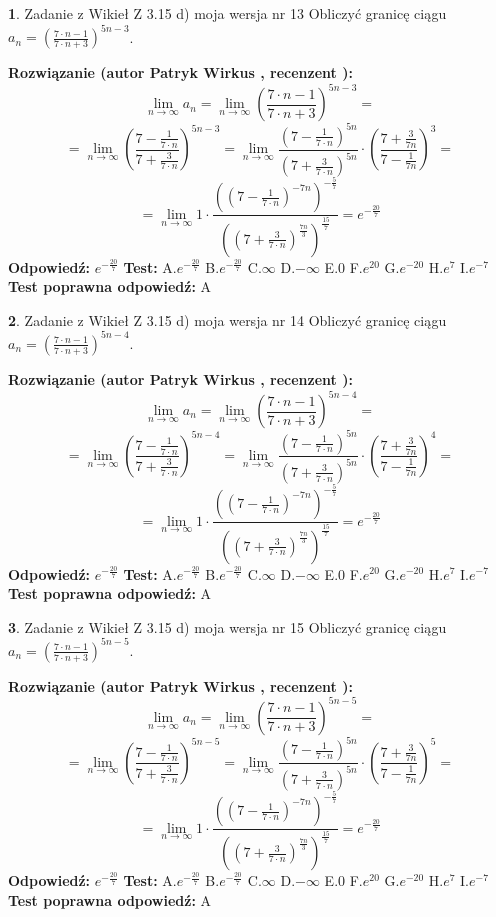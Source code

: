 \documentclass[12pt, a4paper]{article}
\theoremstyle{definition} %
\newtheorem{zad}{}
\newcommand{\zadStart}[1]{\begin{zad}#1\newline}
\newcommand{\zadStop}{\end{zad}}
\newcommand{\rozwStart}[2]{\noindent \textbf{Rozwiązanie (autor #1 , recenzent #2): }\newline}
\newcommand{\rozwStop}{\newline}
\newcommand{\odpStart}{\noindent \textbf{Odpowiedź:}\newline}
\newcommand{\odpStop}{\newline}
\newcommand{\testStart}{\noindent \textbf{Test:}\newline}
\newcommand{\testStop}{\newline}
\newcommand{\kluczStart}{\noindent \textbf{Test poprawna odpowiedź:}\newline}
\newcommand{\kluczStop}{\newline}
\begin{document}
\zadStart{Zadanie z Wikieł Z 3.15 d) moja wersja nr 13}
Obliczyć granicę ciągu $a_{n}=(\frac{7\cdot n - 1}{7 \cdot n + 3})^{5n-3}$.
\zadStop
\rozwStart{Patryk Wirkus}{}
$$\lim\limits_{n\to\infty} a_{n} = \lim\limits_{n\to\infty}(\frac{7\cdot n - 1}{7 \cdot n + 3})^{5n-3}=$$
$$=\lim\limits_{n\to\infty}(\frac{7 - \frac{1}{7\cdot n}}{7 + \frac{3}{7 \cdot n}})^{5n-3}=\lim\limits_{n\to\infty}\frac{(7 - \frac{1}{7\cdot n})^{5n}}{(7 + \frac{3}{7\cdot n})^{5n}} \cdot (\frac{7+\frac{3}{7n}}{7-\frac{1}{7n}})^{3}=$$
$$=\lim\limits_{n\to\infty} 1 \cdot \frac{((7-\frac{1}{7 \cdot n})^{-7n})^{-\frac{5}{7}}}{((7+\frac{3}{7 \cdot n})^{\frac{7n}{3}})^{\frac{15}{7}}} =e^{-\frac{20}{7}}$$
\rozwStop
\odpStart
$e^{-\frac{20}{7}}$
\odpStop
\testStart
A.$ e^{-\frac{20}{7}}$
B.$ e^{-\frac{20}{7}}$
C.$\infty$
D.$-\infty$
E.$0$
F.$e^{20}$
G.$e^{-20}$
H.$e^{7}$
I.$e^{-7}$
\testStop
\kluczStart
A
\kluczStop



\zadStart{Zadanie z Wikieł Z 3.15 d) moja wersja nr 14}
Obliczyć granicę ciągu $a_{n}=(\frac{7\cdot n - 1}{7 \cdot n + 3})^{5n-4}$.
\zadStop
\rozwStart{Patryk Wirkus}{}
$$\lim\limits_{n\to\infty} a_{n} = \lim\limits_{n\to\infty}(\frac{7\cdot n - 1}{7 \cdot n + 3})^{5n-4}=$$
$$=\lim\limits_{n\to\infty}(\frac{7 - \frac{1}{7\cdot n}}{7 + \frac{3}{7 \cdot n}})^{5n-4}=\lim\limits_{n\to\infty}\frac{(7 - \frac{1}{7\cdot n})^{5n}}{(7 + \frac{3}{7\cdot n})^{5n}} \cdot (\frac{7+\frac{3}{7n}}{7-\frac{1}{7n}})^{4}=$$
$$=\lim\limits_{n\to\infty} 1 \cdot \frac{((7-\frac{1}{7 \cdot n})^{-7n})^{-\frac{5}{7}}}{((7+\frac{3}{7 \cdot n})^{\frac{7n}{3}})^{\frac{15}{7}}} =e^{-\frac{20}{7}}$$
\rozwStop
\odpStart
$e^{-\frac{20}{7}}$
\odpStop
\testStart
A.$ e^{-\frac{20}{7}}$
B.$ e^{-\frac{20}{7}}$
C.$\infty$
D.$-\infty$
E.$0$
F.$e^{20}$
G.$e^{-20}$
H.$e^{7}$
I.$e^{-7}$
\testStop
\kluczStart
A
\kluczStop



\zadStart{Zadanie z Wikieł Z 3.15 d) moja wersja nr 15}
Obliczyć granicę ciągu $a_{n}=(\frac{7\cdot n - 1}{7 \cdot n + 3})^{5n-5}$.
\zadStop
\rozwStart{Patryk Wirkus}{}
$$\lim\limits_{n\to\infty} a_{n} = \lim\limits_{n\to\infty}(\frac{7\cdot n - 1}{7 \cdot n + 3})^{5n-5}=$$
$$=\lim\limits_{n\to\infty}(\frac{7 - \frac{1}{7\cdot n}}{7 + \frac{3}{7 \cdot n}})^{5n-5}=\lim\limits_{n\to\infty}\frac{(7 - \frac{1}{7\cdot n})^{5n}}{(7 + \frac{3}{7\cdot n})^{5n}} \cdot (\frac{7+\frac{3}{7n}}{7-\frac{1}{7n}})^{5}=$$
$$=\lim\limits_{n\to\infty} 1 \cdot \frac{((7-\frac{1}{7 \cdot n})^{-7n})^{-\frac{5}{7}}}{((7+\frac{3}{7 \cdot n})^{\frac{7n}{3}})^{\frac{15}{7}}} =e^{-\frac{20}{7}}$$
\rozwStop
\odpStart
$e^{-\frac{20}{7}}$
\odpStop
\testStart
A.$ e^{-\frac{20}{7}}$
B.$ e^{-\frac{20}{7}}$
C.$\infty$
D.$-\infty$
E.$0$
F.$e^{20}$
G.$e^{-20}$
H.$e^{7}$
I.$e^{-7}$
\testStop
\kluczStart
A
\kluczStop
\end{document}

